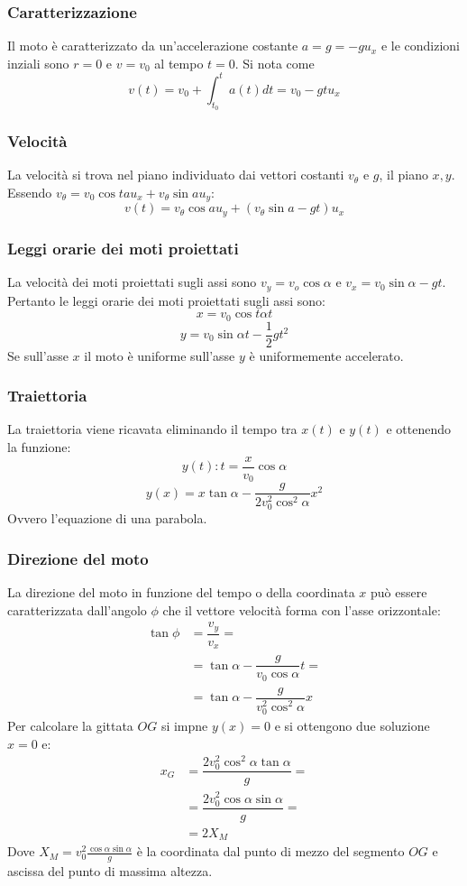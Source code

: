 		\subsubsection{Caratterizzazione}
		Il moto \`e caratterizzato da un'accelerazione costante $a=g=-gu_x$ e le condizioni inziali sono $r=0$ e $v=v_0$ al tempo $t=0$.
		Si nota come
		$$v(t)=v_0+\int_{t_0}^ta(t)dt=v_0-gtu_x$$

		\subsubsection{Velocit\`a}
		La velocit\`a si trova nel piano individuato dai vettori costanti $v_\theta$ e $g$, il piano $x,y$.
		Essendo $v_\theta=v_0\cos t au_x+v_\theta\sin au_y$:
		$$v(t)=v_\theta\cos au_y+(v_\theta\sin a-gt)u_x$$

		\subsubsection{Leggi orarie dei moti proiettati}
		La velocit\`a dei moti proiettati sugli assi sono $v_y=v_o\cos\alpha$ e $v_x=v_0\sin\alpha-gt$.
		Pertanto le leggi orarie dei moti proiettati sugli assi sono:
		$$x=v_0\cos t\alpha t$$
		$$y=v_0\sin\alpha t-\dfrac{1}{2}gt^2$$
		Se sull'asse $x$ il moto \`e uniforme sull'asse $y$ \`e uniformemente accelerato.

		\subsubsection{Traiettoria}
		La traiettoria viene ricavata eliminando il tempo tra $x(t)$ e $y(t)$ e ottenendo la funzione:
		$$y(t):t=\dfrac{x}{v_0}\cos\alpha$$
		$$y(x)=x\tan\alpha-\dfrac{g}{2v_0^2\cos^2\alpha}x^2$$
		Ovvero l'equazione di una parabola.

		\subsubsection{Direzione del moto}
		La direzione del moto in funzione del tempo o della coordinata $x$ pu\`o essere caratterizzata dall'angolo $\phi$ che il vettore velocit\`a forma con l'asse orizzontale:
		\begin{align*}
			\tan\phi&=\dfrac{v_y}{v_x}=\\
			     &=\tan\alpha-\dfrac{g}{v_0\cos\alpha}t=\\
					 &=\tan\alpha-\dfrac{g}{v_0^2\cos^2\alpha}x
		\end{align*}
		Per calcolare la gittata $OG$ si impne $y(x)=0$ e si ottengono due soluzione $x=0$ e:
		\begin{align*}
			x_G&=\dfrac{2v_0^2\cos^2\alpha\tan\alpha}{g}=\\
			   &=\dfrac{2v_0^2\cos\alpha\sin\alpha}{g}=\\
				 &=2X_M
		\end{align*}
		Dove $X_M=v_0^2\frac{\cos\alpha\sin\alpha}{g}$ \`e la coordinata dal punto di mezzo del segmento $OG$ e ascissa del punto di massima altezza.

